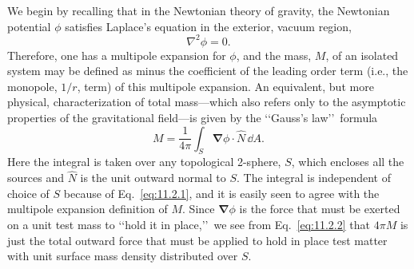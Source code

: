 We begin by recalling that in the Newtonian theory of gravity, the Newtonian
potential \(\phi\) satisfies Laplace's equation in the exterior, vacuum region,
\begin{equation}
  \nabla^2\phi=0.
  \tag{11.2.1}\label{eq:11.2.1}
\end{equation}
Therefore, one has a multipole expansion for \(\phi\), and the mass, \(M\), of an
isolated system may be defined as minus the coefficient of the leading order term
(i.e., the monopole, \(1/r\), term) of this multipole expansion. An equivalent, but
more physical, characterization of total mass---which also refers only to the
asymptotic properties of the gravitational field---is given by the \lq\lq Gauss's
law\rq\rq\ formula
\begin{equation}
  M=\frac{1}{4\pi}\int_S \boldsymbol{\nabla}\phi\cdot\hat N\,\dd A.
  \tag{11.2.2}\label{eq:11.2.2}
\end{equation}
Here the integral is taken over any topological 2-sphere, \(S\), which encloses all
the sources and \(\hat N\) is the unit outward normal to \(S\). The integral is
independent of choice of \(S\) because of Eq.~\eqref{eq:11.2.1}, and it is easily seen
to agree with the multipole expansion definition of \(M\). Since \(\boldsymbol{\nabla}\phi\)
is the force that must be exerted on a unit test mass to \lq\lq hold it in place,\rq\rq\ we
see from Eq.~\eqref{eq:11.2.2} that \(4\pi M\) is just the total outward force that
must be applied to hold in place test matter with unit surface mass density
distributed over \(S\).

